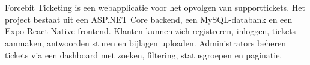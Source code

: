 ﻿%

%
%
%
%
%

%



\chapter*{}

Forcebit Ticketing is een webapplicatie voor het opvolgen van supporttickets. Het project bestaat uit een ASP.NET Core backend, een MySQL-databank en een Expo React Native frontend. Klanten kunnen zich registreren, inloggen, tickets aanmaken, antwoorden sturen en bijlagen uploaden. Administrators beheren tickets via een dashboard met zoeken, filtering, statusgroepen en paginatie.

